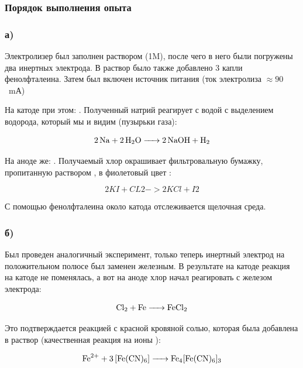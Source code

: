 \documentclass[a4paper, 12pt]{article}
\begin{document}
\subsubsection{Порядок выполнения опыта}

\subsubsection*{а)}

Электролизер был заполнен раствором  (1M), после чего в него были погружены два инертных электрода. В раствор было также добавлено 3 капли фенолфталеина. Затем был включен источник питания (ток электролиза $\approx 90$~mА)

На катоде при этом: . Полученный натрий реагирует с водой с выделением водорода, который мы и видим (пузырьки газа):

\begin{equation}
	\ce{2Na + 2H2O -> 2NaOH + H2}
\end{equation}

На аноде же: . Получаемый хлор окрашивает фильтровальную бумажку, пропитанную раствором , в фиолетовый цвет :

\begin{equation}
	2KI + CL2 -> 2KCl + I2
\end{equation}

С помощью фенолфталеина около катода отслеживается щелочная среда.

\subsubsection*{б)}

Был проведен аналогичный эксперимент, только теперь инертный электрод на положительном полюсе был заменен железным. В результате на катоде реакция на катоде не поменялась, а вот на аноде хлор начал реагировать с железом электрода:

\begin{equation}
	\ce{Cl2 + Fe -> FeCl2}
\end{equation}

Это подтверждается реакцией с красной кровяной солью, которая была добавлена в раствор (качественная реакция на ионы ):

\begin{equation}
	\ce{Fe^{2+} + 3[Fe(CN)6] -> Fe4[Fe(CN)6]3}
\end{equation}
\end{document}
